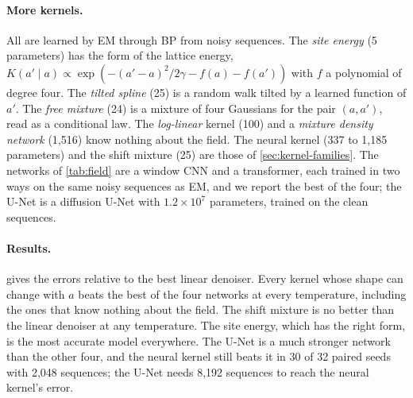 \documentclass{article}
\begin{document}
\paragraph{More kernels.} All are learned by EM through BP from noisy sequences. The \emph{site energy} (5 parameters)
has the form of the lattice energy, $K(a'\mid a)\propto\exp(-(a'-a)^2/2\gamma-f(a)-f(a'))$ with $f$ a polynomial of
degree four. The \emph{tilted spline} (25) is a random walk tilted by a learned function of $a'$. The \emph{free mixture}
(24) is a mixture of four Gaussians for the pair $(a,a')$, read as a conditional law. The \emph{log-linear} kernel
(100) and a \emph{mixture density network} (1{,}516) know nothing about the field. The neural kernel (337 to 1{,}185
parameters) and the shift mixture (25) are those of \cref{sec:kernel-families}. The networks of \cref{tab:field} are a
window CNN and a transformer, each trained in two ways on the same noisy sequences as EM, and we report the best of the
four; the U-Net is a diffusion U-Net with $1.2\times10^7$ parameters, trained on the clean sequences.

\paragraph{Results.}  gives the errors relative to the best linear denoiser. Every kernel whose shape can
change with $a$ beats the best of the four networks at every temperature, including the ones that know nothing about
the field. The shift mixture is no better than the linear denoiser at any temperature. The site energy, which has the
right form, is the most accurate model everywhere. The U-Net is a much stronger network than the other four, and the
neural kernel still beats it in 30 of 32 paired seeds with 2{,}048 sequences; the U-Net needs 8{,}192 sequences to
reach the neural kernel's error.

\begin{table}[!htbp]
  \caption{Allen--Cahn field: relative score error divided by that of the best linear denoiser, from 2{,}048 training
  sequences; mean over 16 seeds (8 for the neural kernel and the U-Net). Best of four: a window CNN and a transformer,
  each trained in two ways on the same noisy sequences as EM. Dashes: not run.}
  \label{tab:field}
  \centering
  \small
  \setlength{\tabcolsep}{3.5pt}
  
\end{table}
\end{document}
